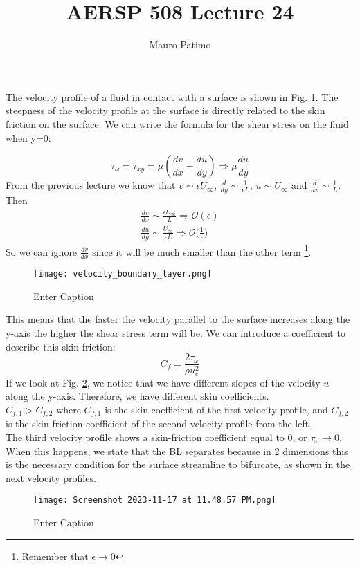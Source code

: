 \documentclass{article}
\begin{document}
\title{AERSP 508 Lecture 24}
\author{Mauro Patimo}
\maketitle

The velocity profile of a fluid in contact with a surface is shown in Fig. \ref{fig:velocity profile}. The steepness of the velocity profile at the surface is directly related to the skin friction on the surface. We can write the formula for the shear stress on the fluid when y=0:

\begin{equation}
    \tau_\omega = \tau_{xy}=\mu(\frac{dv}{dx}+\frac{du}{dy})\Rightarrow \mu\frac{du}{dy}
\end{equation}
From the previous lecture we know that $v \sim \epsilon U_\infty$, $\frac{d}{dy} \sim \frac{1}{\epsilon L}$, $u\sim U_\infty$ and $\frac{d}{dx} \sim \frac{1}{L}$. Then 
\begin{align}
    \frac{dv}{dx} \sim \frac{\epsilon U_\infty}{L} \Rightarrow \mathcal{O}(\epsilon)\\
    \frac{du}{dy} \sim \frac{U_\infty}{\epsilon L} \Rightarrow \mathcal{O}\Big(\frac{1}{\epsilon}\Big)
\end{align}
So we can ignore $\frac{dv}{dx}$ since it will be much smaller than the other term \footnote{Remember that $\epsilon\to 0$}. \\
\begin{figure}
    \centering
    \texttt{[image: velocity\_boundary\_layer.png]}
    \caption{Enter Caption}
    \label{fig:velocity profile}
\end{figure}

This means that the faster the velocity parallel to the surface increases along the y-axis the higher the shear stress term will be. We can introduce a coefficient to describe this skin friction:
\begin{equation}
    C_f = \frac{2 \tau_\omega}{\rho u_e^2}
\end{equation}
If we look at Fig. \ref{fig:skin friction}, we notice that we have different slopes of the velocity $u$ along the y-axis. Therefore, we have different skin coefficients.\\
$C_{f,1} > C_{f,2}$ where $C_{f,1}$ is the skin coefficient of the first velocity profile, and $C_{f,2}$ is the skin-friction coefficient of the second velocity profile from the left. \\
The third velocity profile shows a skin-friction coefficient equal to 0, or $\tau_\omega \to 0$. When this happens, we state that the BL separates because in 2 dimensions this is the necessary condition for the surface streamline to bifurcate, as shown in the next velocity profiles.
\begin{figure}
    \centering
    \texttt{[image: Screenshot 2023-11-17 at 11.48.57 PM.png]}
    \caption{Enter Caption}
    \label{fig:skin friction}
\end{figure}
\end{document}
